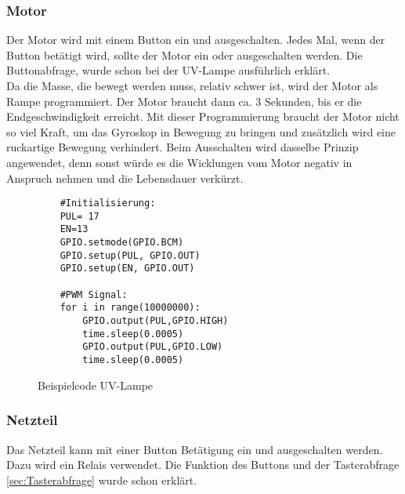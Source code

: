 \subsubsection{Motor}\label{sec:test motor}
Der Motor wird mit einem Button ein und ausgeschalten. Jedes Mal, wenn der Button betätigt wird, sollte der Motor ein oder ausgeschalten werden. Die Buttonabfrage, wurde schon bei der UV-Lampe ausführlich erklärt.  \\
\vspace{3mm}
Da die Masse, die bewegt werden muss, relativ schwer ist, wird der Motor als Rampe programmiert. Der Motor braucht dann ca. 3 Sekunden, bis er die Endgeschwindigkeit erreicht. Mit dieser Programmierung braucht der Motor nicht so viel Kraft, um das Gyroskop in
Bewegung zu bringen und zusätzlich wird eine ruckartige Bewegung verhindert. Beim Ausschalten wird dasselbe Prinzip angewendet, denn sonst würde es die Wicklungen vom Motor negativ in Anspruch nehmen und die Lebensdauer verkürzt.\\
\vspace{3mm}
\begin{figure}[H]
    \centering
    \begin{verbatim}
    #Initialisierung:
    PUL= 17
    EN=13
    GPIO.setmode(GPIO.BCM)
    GPIO.setup(PUL, GPIO.OUT)
    GPIO.setup(EN, GPIO.OUT)

    #PWM Signal:
    for i in range(10000000):
        GPIO.output(PUL,GPIO.HIGH)
        time.sleep(0.0005)
        GPIO.output(PUL,GPIO.LOW)
        time.sleep(0.0005)

    \end{verbatim}
    \caption{Beispielcode UV-Lampe}
\end{figure}

\subsubsection{Netzteil}\label{sec:test netzteil}
Das Netzteil kann mit einer Button Betätigung ein und ausgeschalten werden. Dazu wird ein Relais verwendet. Die Funktion des Buttons und der Tasterabfrage \ref{sec:Tasterabfrage} wurde schon erklärt. 
\newpage
